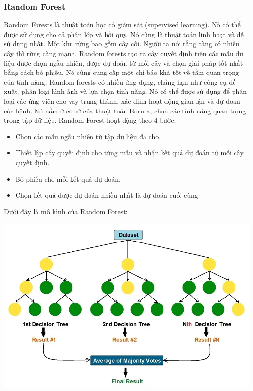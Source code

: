\documentclass{ieeeojies}
\begin{document}
\subsubsection{Random Forest}
Random Forests là thuật toán học có giám sát (supervised learning). Nó có thể được sử dụng cho cả phân lớp và hồi quy. Nó cũng là thuật toán linh hoạt và dễ sử dụng nhất. Một khu rừng bao gồm cây cối. Người ta nói rằng càng có nhiều cây thì rừng càng mạnh. Random forests tạo ra cây quyết định trên các mẫu dữ liệu được chọn ngẫu nhiên, được dự đoán từ mỗi cây và chọn giải pháp tốt nhất bằng cách bỏ phiếu. Nó cũng cung cấp một chỉ báo khá tốt về tầm quan trọng của tính năng. Random forests có nhiều ứng dụng, chẳng hạn như công cụ đề xuất, phân loại hình ảnh và lựa chọn tính năng. Nó có thể được sử dụng để phân loại các ứng viên cho vay trung thành, xác định hoạt động gian lận và dự đoán các bệnh. Nó nằm ở cơ sở của thuật toán Boruta, chọn các tính năng quan trọng trong tập dữ liệu.
Random Forest hoạt động theo 4 bước:
\begin{itemize}
    \item Chọn các mẫu ngẫu nhiên từ tập dữ liệu đã cho.
    \item Thiết lập cây quyết định cho từng mẫu và nhận kết quả dự đoán từ mỗi cây quyết định.
    \item Bỏ phiếu cho mỗi kết quả dự đoán.
    \item Chọn kết quả được dự đoán nhiều nhất là dự đoán cuối cùng.
\end{itemize}

Dưới đây là mô hình của Random Forest:
\begin{center}
\begin{minipage}{0.4\textwidth}
\includegraphics[width=1\textwidth]{bibliography/pictures/RandomForest.jpg}
\end{minipage}    
\end{center}
\end{document}
